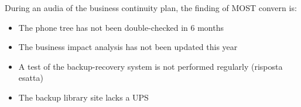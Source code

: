 
During an audia of the business continuity plan, the finding of MOST convern is:
\begin{itemize}
  \item The phone tree has not been double-checked in 6 months
  \item The business impact analysis has not been updated this year
  \item A test of the  backup-recovery system is not performed regularly 
  (risposta esatta)
  \item The backup library site lacks a UPS
\end{itemize}